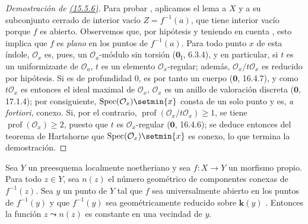 \begin{proof}[Demostración de {\rm {\hyperlink{ega4.c04.lem.15-5-6}{(15.5.6)}}}]
Para probar , aplicamos el lema  a $X$ y a su subconjunto cerrado de interior vacío $Z=f^{-1}(a)$, que tiene interior vacío porque $f$ es abierto.
Observemos que, por hipótesis y teniendo en cuenta , esto implica que $f$ es \emph{plano} en los puntos de $f^{-1}(a)$.
Para todo punto $x$ de esta índole, $\mathcal O_x$ es, pues, un $\mathcal O_a$-módulo sin torsión ($\mathbf{0}_{\mathrm I}$, 6.3.4), y en particular, si $t$ es un uniformizante de $\mathcal O_a$, $t$ es un elemento $\mathcal O_x$-regular; además, $\mathcal O_x/t\mathcal O_x$ es reducido por hipótesis. Si es de profundidad $0$, es por tanto un cuerpo ($\mathbf{0}$, 16.4.7), y como $t\mathcal O_x$ es entonces el ideal maximal de $\mathcal O_x$, $\mathcal O_x$ es un anillo de valoración discreta ($\mathbf{0}$, 17.1.4); por consiguiente, $\operatorname{Spec}(\mathcal O_x)\setmin\{x\}$ consta de un solo punto y es, \emph{a fortiori}, conexo.
Si, por el contrario, $\operatorname{prof}(\mathcal O_x/t\mathcal O_x)\geqslant 1$, se tiene $\operatorname{prof}(\mathcal O_x)\geqslant 2$, puesto que $t$ es $\mathcal O_x$-regular ($\mathbf{0}$, 16.4.6); se deduce entonces del teorema de Hartshorne  que $\operatorname{Spec}(\mathcal O_x)\setmin\{x\}$ es conexo, lo que termina la demostración.
\end{proof}

\begin{proposition}[15.5.7]
\label{IV.15.5.7}
Sea $Y$ un preesquema localmente noetheriano y sea $f:X\to Y$ un morfismo propio.
Para todo $z\in Y$, sea $n(z)$ el número geométrico de componentes conexas de $f^{-1}(z)$.
Sea $y$ un punto de $Y$ tal que $f$ sea universalmente abierto en los puntos de $f^{-1}(y)$ y que $f^{-1}(y)$ sea geométricamente reducido sobre $\boldsymbol{k}(y)$ .
Entonces la función $z\leadsto n(z)$ es constante en una vecindad de $y$.
\end{proposition}


